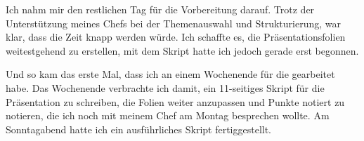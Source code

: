 Ich nahm mir den restlichen Tag für die Vorbereitung darauf.
Trotz der Unterstützung meines Chefs bei der Themenauswahl und Strukturierung, war klar, dass die Zeit knapp werden würde.
Ich schaffte es, die Präsentationsfolien weitestgehend zu erstellen, mit dem Skript hatte ich jedoch gerade erst begonnen.


Und so kam das erste Mal, dass ich an einem Wochenende für die {\metaeffekt} gearbeitet habe.
Das Wochenende verbrachte ich damit, ein 11-seitiges Skript für die Präsentation zu schreiben, die Folien weiter anzupassen und Punkte notiert zu notieren, die ich noch mit meinem Chef am Montag besprechen wollte.
Am Sonntagabend hatte ich ein ausführliches Skript fertiggestellt.
